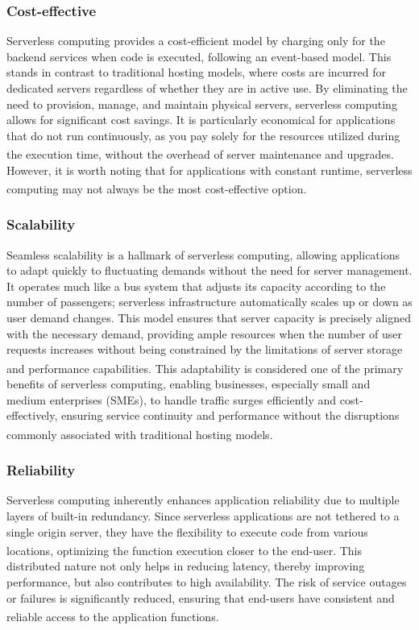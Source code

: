 \subsubsection{Cost-effective}
Serverless computing provides a cost-efficient model by charging only for the backend services when
code is executed, following an event-based model. This stands in contrast to traditional hosting
models, where costs are incurred for dedicated servers regardless of whether they are in active use.
By eliminating the need to provision, manage, and maintain physical servers, serverless computing
allows for significant cost savings. It is particularly economical for applications that do not run
continuously, as you pay solely for the resources utilized during the execution time, without the
overhead of server maintenance and
upgrades\textsuperscript{\cite{serverless_2}}\textsuperscript{\cite{serverless_3}}. However, it is
worth noting that for applications with constant runtime, serverless computing may not always be the
most cost-effective option\textsuperscript{\cite{serverless_4}}.

\subsubsection{Scalability}
Seamless scalability is a hallmark of serverless computing, allowing applications to adapt quickly
to fluctuating demands without the need for server management. It operates much like a bus system
that adjusts its capacity according to the number of passengers; serverless infrastructure
automatically scales up or down as user demand changes. This model ensures that server capacity is
precisely aligned with the necessary demand, providing ample resources when the number of user
requests increases without being constrained by the limitations of server storage and performance
capabilities\textsuperscript{\cite{serverless_2}}. This adaptability is considered one of the
primary benefits of serverless computing, enabling businesses, especially small and medium
enterprises (SMEs), to handle traffic surges efficiently and cost-effectively, ensuring service
continuity and performance without the disruptions commonly associated with traditional hosting
models\textsuperscript{\cite{serverless_3}}.

\subsubsection{Reliability}
Serverless computing inherently enhances application reliability due to multiple layers of built-in
redundancy. Since serverless applications are not tethered to a single origin server, they have the
flexibility to execute code from various locations, optimizing the function execution closer to the
end-user\textsuperscript{\cite{serverless_2}}\textsuperscript{\cite{serverless_3}}. This distributed
nature not only helps in reducing latency, thereby improving performance, but also contributes to
high availability. The risk of service outages or failures is significantly reduced, ensuring that
end-users have consistent and reliable access to the application
functions\textsuperscript{\cite{serverless_4}}.

